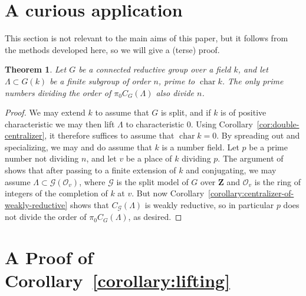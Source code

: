 \documentclass[11pt, letterpaper,english]{amsart}
\theoremstyle{plain}
\newtheorem{theorem}[lem]{Theorem}
\theoremstyle{definition}
\numberwithin{equation}{section}
\numberwithin{lem}{section}
\newcommand{\mathfont}{\mathbf}
\newcommand{\bZ}{\mathfont{Z}}
\newcommand{\sG}{{\mathscr G}}
\newcommand{\sO}{{\mathscr O}}
\DeclareMathOperator{\chara} {char}
\begin{document}
\section{A curious application}\label{section:appendix-b}

This section is not relevant to the main aims of this paper, but it follows from the methods developed here, so we will give a (terse) proof.  

\begin{theorem}
Let $G$ be a connected reductive group over a field $k$, and let $\Lambda \subset G(k)$ be a finite subgroup of order $n$, prime to $\chara k$. The only prime numbers dividing the order of $\pi_0 C_G(\Lambda)$ also divide $n$.
\end{theorem}

\begin{proof}
We may extend $k$ to assume that $G$ is split, and if $k$ is of positive characteristic we may then lift $\Lambda$ to characteristic $0$. Using Corollary~\ref{cor:double-centralizer}, it therefore suffices to assume that $\chara k = 0$. By spreading out and specializing, we may and do assume that $k$ is a number field. Let $p$ be a prime number not dividing $n$, and let $v$ be a place of $k$ dividing $p$. The argument of \cite[Lemma A.8]{Griess-Ryba} shows that after passing to a finite extension of $k$ and conjugating, we may assume $\Lambda \subset \sG(\sO_v)$, where $\sG$ is the split model of $G$ over $\bZ$ and $\sO_v$ is the ring of integers of the completion of $k$ at $v$. But now Corollary~\ref{corollary:centralizer-of-weakly-reductive} shows that $C_{\sG}(\Lambda)$ is weakly reductive, so in particular $p$ does not divide the order of $\pi_0 C_G(\Lambda)$, as desired.
 \end{proof}

 \section{A Proof of Corollary~\ref{corollary:lifting}} \label{appendix-corollary}
\end{document}
